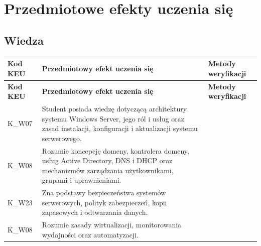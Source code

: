 \documentclass[12pt, a4paper]{article}
\newcommand{\thdrule}{\noalign{\global\setlength{\extrarowheight}{0pt}}}
\newcommand{\thdend}{\noalign{\global\setlength{\extrarowheight}{3pt}}}
\begin{document}
\section{Przedmiotowe efekty uczenia się}

\subsection*{Wiedza}
{\scriptsize
\begin{longtable}{m{1.6cm}m{9.0cm}m{4.2cm}}
\thdrule\toprule
\rowcolor{pjatkRed} {\color{white}\footnotesize\textbf{\vphantom{Ag}Kod KEU}} & {\color{white}\footnotesize\textbf{\vphantom{Ag}Przedmiotowy efekt uczenia się}} & {\color{white}\footnotesize\textbf{\vphantom{Ag}Metody weryfikacji}} \\
\midrule\thdend
\endfirsthead
\thdrule\toprule
\rowcolor{pjatkRed} {\color{white}\footnotesize\textbf{\vphantom{Ag}Kod KEU}} & {\color{white}\footnotesize\textbf{\vphantom{Ag}Przedmiotowy efekt uczenia się}} & {\color{white}\footnotesize\textbf{\vphantom{Ag}Metody weryfikacji}} \\
\midrule\thdend
\endhead
  \rowcolor{tableRowLight} K\_W07 & Student posiada wiedzę dotyczącą architektury systemu Windows Server, jego ról i usług oraz zasad instalacji, konfiguracji i aktualizacji systemu serwerowego. &  \\
  \rowcolor{tableRowAlt} K\_W08 & Rozumie koncepcję domeny, kontrolera domeny, usług Active Directory, DNS i DHCP oraz mechanizmów zarządzania użytkownikami, grupami i uprawnieniami. &  \\
  \rowcolor{tableRowLight} K\_W23 & Zna podstawy bezpieczeństwa systemów serwerowych, polityk zabezpieczeń, kopii zapasowych i odtwarzania danych. &  \\
  \rowcolor{tableRowAlt} K\_W08 & Rozumie zasady wirtualizacji, monitorowania wydajności oraz automatyzacji. &  \\
\bottomrule
\end{longtable}}
\end{document}
